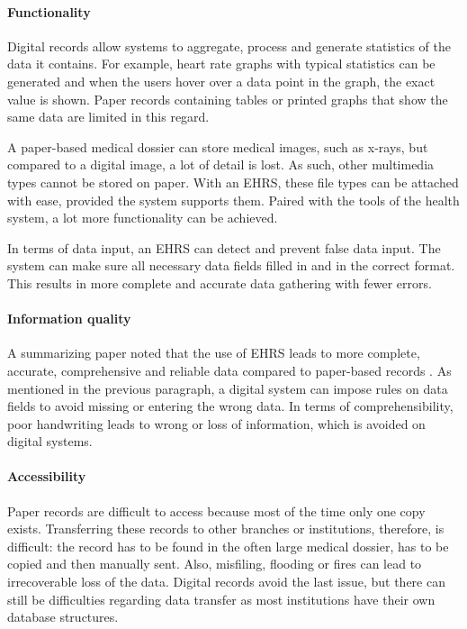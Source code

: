         \paragraph{Functionality} Digital records allow systems to aggregate, process and generate statistics of the data it contains. For example, heart rate graphs with typical statistics can be generated and when the users hover over a data point in the graph, the exact value is shown. Paper records containing tables or printed graphs that show the same data are limited in this regard.

        A paper-based medical dossier can store medical images, such as x-rays, but compared to a digital image, a lot of detail is lost. As such, other multimedia types cannot be stored on paper. With an EHRS, these file types can be attached with ease, provided the system supports them. Paired with the tools of the health system, a lot more functionality can be achieved.

        In terms of data input, an EHRS can detect and prevent false data input. The system can make sure all necessary data fields filled in and in the correct format. This results in more complete and accurate data gathering with fewer errors.

        \paragraph{Information quality} A summarizing paper noted that the use of EHRS leads to more complete, accurate, comprehensive and reliable data compared to paper-based records \cite{ehrs_summary}. As mentioned in the previous paragraph, a digital system can impose rules on data fields to avoid missing or entering the wrong data. In terms of comprehensibility, poor handwriting leads to wrong or loss of information, which is avoided on digital systems.

        \paragraph{Accessibility} Paper records are difficult to access because most of the time only one copy exists. Transferring these records to other branches or institutions, therefore, is difficult: the record has to be found in the often large medical dossier, has to be copied and then manually sent. Also, misfiling, flooding or fires can lead to irrecoverable loss of the data. Digital records avoid the last issue, but there can still be difficulties regarding data transfer as most institutions have their own database structures.

